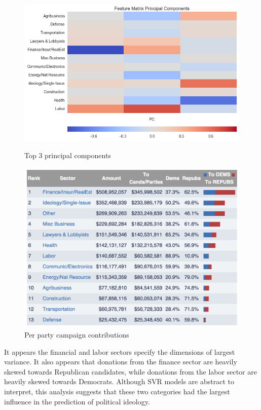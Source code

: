 \documentclass[12]{article}
\begin{document}
\begin{figure}[H]
\centering
\begin{minipage}[b]{0.5\textwidth}
    \includegraphics[width=\textwidth]{cand_2010_2012_2014_fm_trim_normed_pc_hm.png}
    \caption{\label{fig:top_pc}Top 3 principal components}
\end{minipage}
\begin{minipage}[b]{0.45\textwidth}
    \includegraphics[width=\textwidth]{totals_by_sector.png}
    \caption{\label{fig:party_total}Per party campaign contributions}
\end{minipage}
\end{figure}

\noindent It appears the financial and labor sectors specify the dimensions of largest
variance. It also appears that donations from the finance sector are heavily skewed 
towards Republican candidates, while donations from the labor sector are heavily skewed towards
Democrats. Although SVR models are abstract to interpret, this analysis suggests
that these two categories had the largest influence in the prediction of political 
ideology.
\end{document}
